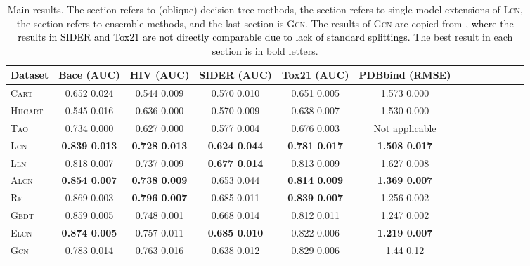 \documentclass{article} \usepackage{iclr2020_conference,times}
\newcommand{\camera}[1]{\textcolor{black}{#1}}
\begin{document}
\begin{table}
  \caption{Main results. The  section refers to (oblique) decision tree methods, the  section refers to single model extensions of \textsc{Lcn}, the  section refers to ensemble methods, and the last section is \textsc{Gcn}. The results of \textsc{Gcn} are copied from \citep{wu2018moleculenet}\camera{, where the results in SIDER and Tox21 are not directly comparable due to lack of standard splittings.} The best result in each \camera{section} is in bold letters.}\label{tab:main}
  \centering
  \begin{tabular}{lcccccccccccc}
    \toprule
    \small Dataset      & \small {Bace (AUC)} & \small {HIV (AUC)} & \small {SIDER (AUC)} & \small {Tox21 (AUC)} & \small {PDBbind (RMSE)}\\
    \midrule
    \textsc{Cart}       & \small 0.652  0.024 & \small 0.544  0.009 & \small 0.570  0.010 & \small 0.651  0.005 & \small 1.573  0.000\\
    \textsc{Hhcart}     & \small 0.545  0.016 & \small 0.636  0.000 & \small 0.570  0.009 & \small 0.638  0.007 & \small 1.530  0.000\\
    \textsc{Tao}        & \small 0.734  0.000 & \small 0.627  0.000 & \small 0.577  0.004 & \small 0.676  0.003 & \small Not applicable\\
    \textsc{Lcn}        & \small \bf 0.839  0.013 & \small \bf 0.728  0.013 & \small \bf 0.624  0.044 & \small \bf 0.781  0.017 & \small \bf 1.508  0.017\\
    \midrule
    {\textsc{Lln}}      & \small 0.818  0.007 & \small 0.737  0.009 & \small \bf 0.677  0.014 & \small 0.813  0.009 & \small 1.627  0.008\\
    \textsc{Alcn}       & \small \bf 0.854  0.007 & \small \bf 0.738  0.009 & \small 0.653  0.044 & \small \bf 0.814  0.009 & \small \bf 1.369  0.007\\
    \midrule
    \textsc{Rf}         & \small 0.869  0.003 & \small \bf 0.796  0.007 & \small 0.685  0.011 & \small \bf 0.839  0.007 & \small 1.256  0.002\\
    \textsc{Gbdt}       & \small 0.859  0.005 & \small 0.748  0.001 & \small 0.668  0.014 & \small 0.812  0.011 & \small 1.247  0.002\\
    \textsc{Elcn}     & \small \bf 0.874  0.005 & \small 0.757  0.011 & \small \bf 0.685  0.010 & \small 0.822  0.006 & \small \bf {1.219  0.007} \\
    \midrule
    \textsc{Gcn}        & \small 0.783  0.014 & \small 0.763  0.016   & \small *0.638  0.012 & \small *0.829  0.006 & \small 1.44  0.12\\
    \bottomrule
  \end{tabular}
\end{table}
\end{document}
